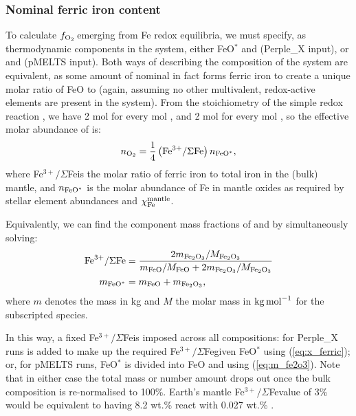 \documentclass[fleqn,usenatbib,twocolumn]{mnras}
\newcommand{\fo}{$f_{\ce{O2}}$}
\newcommand{\xfer}{Fe$^{3+}/\Sigma$Fe}
\begin{document}
\subsubsection{Nominal ferric iron content}

To calculate \fo\,emerging from Fe redox equilibria, we must specify, as thermodynamic components in the system, either FeO$^*$ and  (Perple\_X input), or  and  (pMELTS input). Both ways of describing the composition of the system are equivalent, as some amount of nominal  in fact forms ferric iron to create a unique molar ratio of FeO to  (again,  assuming no other multivalent, redox-active elements are present in the system). From the stoichiometry of the simple redox reaction , we have 2 mol  for every mol , and 2 mol  for every mol , so the effective molar abundance of  is: 
\begin{equation}\label{eq:x_ferric}
n_{\ce{O2}} =  \frac{1}{4}\left(\ce{Fe^{3+}}/\Sigma \ce{Fe}\right) n_{\ce{FeO}^*},
\end{equation}
where \xfer\;is the molar ratio of ferric iron to total iron in the (bulk) mantle, and $n_{\ce{FeO}^*}$ is the molar abundance of Fe in mantle oxides as required by stellar element abundances and $\chi_{\rm Fe}^{\rm mantle}$. 

Equivalently, we can find the component mass fractions of  and  by simultaneously solving:
\begin{equation}\label{eq:m_fe2o3}
\begin{split}
\ce{Fe^{3+}}/\Sigma \ce{Fe} &= \frac{2m_{\ce{Fe2O3}} / M_{\ce{Fe2O3}}}{m_{\ce{FeO}} / M_{\ce{FeO}} + 2m_{\ce{Fe2O3}} / M_{\ce{Fe2O3}}}\\
m_{\ce{FeO}^*} &= m_{\ce{FeO}} + m_{\ce{Fe2O3}},
\end{split}
\end{equation}
where $m$ denotes the mass in kg and $M$ the molar mass in ${\rm kg}\,{\rm mol}^{-1}$ for the subscripted species.

In this way, a fixed \xfer\;is imposed across all compositions: for Perple\_X runs  is added to make up the required \xfer\;given FeO$^*$ using (\ref{eq:x_ferric}); or, for pMELTS runs, FeO$^*$ is divided into FeO and  using (\ref{eq:m_fe2o3}). Note that in either case the total mass or number amount drops out once the bulk composition is re-normalised to 100\%. Earth's mantle \xfer\;value of 3\% would be equivalent to having 8.2 wt.\%  react with 0.027 wt.\% . 
\end{document}
